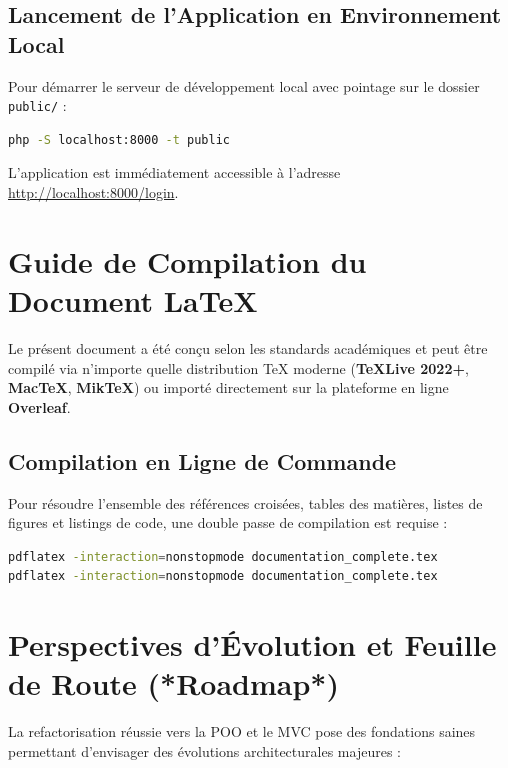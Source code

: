 \documentclass[11pt,a4paper,oneside]{report}
\begin{document}
\subsection{Lancement de l'Application en Environnement Local}
Pour démarrer le serveur de développement local avec pointage sur le dossier \texttt{public/} :

\begin{lstlisting}[language=bash, caption={Lancement du serveur PHP natif}]
php -S localhost:8000 -t public
\end{lstlisting}

L'application est immédiatement accessible à l'adresse \url{http://localhost:8000/login}.

\section{Guide de Compilation du Document LaTeX}

Le présent document a été conçu selon les standards académiques et peut être compilé via n'importe quelle distribution TeX moderne (\textbf{TeXLive 2022+}, \textbf{MacTeX}, \textbf{MikTeX}) ou importé directement sur la plateforme en ligne \textbf{Overleaf}.

\subsection{Compilation en Ligne de Commande}
Pour résoudre l'ensemble des références croisées, tables des matières, listes de figures et listings de code, une double passe de compilation est requise :

\begin{lstlisting}[language=bash, caption={Compilation de la documentation via pdflatex}]
pdflatex -interaction=nonstopmode documentation_complete.tex
pdflatex -interaction=nonstopmode documentation_complete.tex
\end{lstlisting}

\section{Perspectives d'Évolution et Feuille de Route (*Roadmap*)}

La refactorisation réussie vers la POO et le MVC pose des fondations saines permettant d'envisager des évolutions architecturales majeures :
\end{document}
